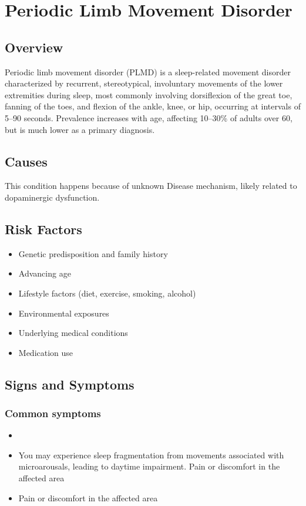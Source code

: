 \chapter{Periodic Limb Movement Disorder}
\label{sec:Periodic Limb Movement Disorder}

\section{Overview}
Periodic limb movement disorder (PLMD) is a sleep-related movement disorder characterized by recurrent, stereotypical, involuntary movements of the lower extremities during sleep, most commonly involving dorsiflexion of the great toe, fanning of the toes, and flexion of the ankle, knee, or hip, occurring at intervals of 5--90 seconds. Prevalence increases with age, affecting 10--30\% of adults over 60, but is much lower as a primary diagnosis.
\section{Causes}
This condition happens because of unknown Disease mechanism, likely related to dopaminergic dysfunction.     
\section{Risk Factors}

\begin{itemize}[noitemsep]
  \item Genetic predisposition and family history
  \item Advancing age
  \item Lifestyle factors (diet, exercise, smoking, alcohol)
  \item Environmental exposures
  \item Underlying medical conditions
  \item Medication use
\end{itemize}
\section{Signs and Symptoms}

\subsection{Common symptoms}
\begin{itemize}[noitemsep]
  \item \item You may experience sleep fragmentation from movements associated with microarousals, leading to daytime impairment. Pain or discomfort in the affected area    \item Pain or discomfort in the affected area
  \end{itemize}


